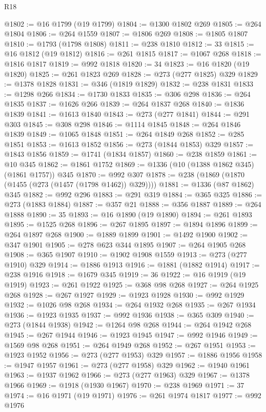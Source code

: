 \begin{lexlean}{R18}
\begin{coremodule}
{{{{{{{{{{{{{{{{{{{@1802 := @16 @1799 (@19 @1799)
@1804 := @1300 @1802 @269
@1805 := @264 @1804
@1806 := @264 @1559
@1807 := @1806 @269
@1808 := @1805 @1807
@1810 := @1793 (@1798 @1808)
@1811 := @238 @1810
@1812 := 33
@1815 := @16 @1812 (@19 @1812)
@1816 := @261 @1815
@1817 := @1067 @268
@1818 := @1816 @1817
@1819 := @992 @1818
@1820 := 34
@1823 := @16 @1820 (@19 @1820)
@1825 := @261 @1823 @269
@1828 := @273 (@277 @1825) @329
@1829 := @1378 @1828
@1831 := @346 (@1819 @1829)
@1832 := @238 @1831
@1833 := @1298 @266
@1834 := @1730 @1833
@1835 := @306 @298
@1836 := @264 @1835
@1837 := @1626 @266
@1839 := @264 @1837 @268
@1840 := @1836 @1839
@1841 := @1613 @1840
@1843 := @273 (@277 @1841)
@1844 := @291 @303
@1845 := @308 @298
@1846 := @1114 @1845
@1848 := @264 @1846 @1839
@1849 := @1065 @1848
@1851 := @264 @1849 @268
@1852 := @285 @1851
@1853 := @1613 @1852
@1856 := @273 (@1844 @1853) @329
@1857 := @1843 @1856
@1859 := @1741 (@1834 @1857)
@1860 := @238 @1859
@1861 := @10 @345
@1862 := @1861 @1752
@1869 := @1336 (@10 (@1388 @1862 @345) (@1861 @1757)) @345
@1870 := @992 @307
@1878 := @238 (@1869 (@1870 (@1455 (@273 (@1457 (@1798 @1462)) @329))))
@1881 := @1336 (@87 @1862) @345
@1882 := @992 @296
@1883 := @291 @319
@1884 := @365 @325
@1886 := @273 (@1883 @1884)
@1887 := @357 @21
@1888 := @356 @1887
@1889 := @264 @1888
@1890 := 35
@1893 := @16 @1890 (@19 @1890)
@1894 := @261 @1893
@1895 := @1525 @268
@1896 := @267 @1895
@1897 := @1894 @1896
@1899 := @264 @1897 @268
@1900 := @1889 @1899
@1901 := @1492 @1900
@1902 := @347 @1901
@1905 := @278 @623 @344 @1895
@1907 := @264 @1905 @268
@1908 := @365 @1907
@1910 := @1902 @1908 @1559
@1913 := @273 (@277 @1910) @329
@1914 := @1886 @1913
@1916 := @1881 (@1882 @1914)
@1917 := @238 @1916
@1918 := @1679 @345
@1919 := 36
@1922 := @16 @1919 (@19 @1919)
@1923 := @261 @1922
@1925 := @368 @98 @268
@1927 := @264 @1925 @268
@1928 := @267 @1927
@1929 := @1923 @1928
@1930 := @992 @1929
@1932 := @1026 @98 @268
@1934 := @264 @1932 @268
@1935 := @267 @1934
@1936 := @1923 @1935
@1937 := @992 @1936
@1938 := @365 @309
@1940 := @273 (@1844 @1938)
@1942 := @1264 @98 @268
@1944 := @264 @1942 @268
@1945 := @267 @1944
@1946 := @1923 @1945
@1947 := @992 @1946
@1949 := @1569 @98 @268
@1951 := @264 @1949 @268
@1952 := @267 @1951
@1953 := @1923 @1952
@1956 := @273 (@277 @1953) @329
@1957 := @1886 @1956
@1958 := @1947 @1957
@1961 := @273 (@277 @1958) @329
@1962 := @1940 @1961
@1963 := @1937 @1962
@1966 := @273 (@277 @1963) @329
@1967 := @1378 @1966
@1969 := @1918 (@1930 @1967)
@1970 := @238 @1969
@1971 := 37
@1974 := @16 @1971 (@19 @1971)
@1976 := @261 @1974 @1817
@1977 := @992 @1976
}}}}}}}}}}}}}}}}}}}
\end{coremodule}
\end{lexlean}
